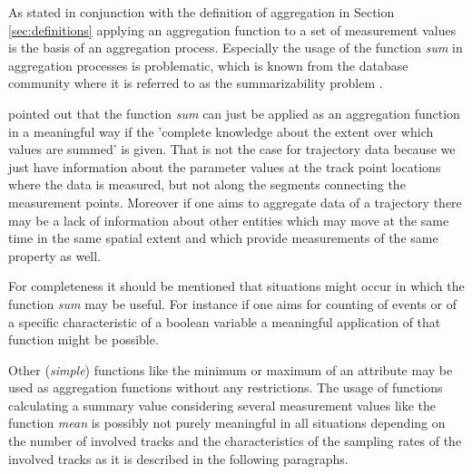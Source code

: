 \documentclass[12pt, oneside, a4paper]{scrbook}
\begin{document}

As stated in conjunction with the definition of aggregation in Section \ref{sec:definitions}
applying an aggregation function to a set of measurement values is the basis of an aggregation process.
Especially the usage of the function \textit{sum} in aggregation processes is problematic, which is known from the database community where it is referred to as the summarizability problem \citep{lenz_summarizability_1997, mazon_survey_2009}.
\par\medskip
\citet {stasch_meaningful_2014} pointed out that the function \textit{sum} can just be applied as an aggregation function in a meaningful way if the 'complete knowledge about the extent over which values are summed' is given.
That is not the case for trajectory data because we just have information about the parameter values at the track point locations where the data is measured, but not along the segments connecting the measurement points. 
Moreover if one aims to aggregate data of a trajectory there may be a lack of information about other entities which may move at the same time in the same spatial extent and which provide measurements of the same property as well.
\par\medskip
For completeness it should be mentioned that situations might occur in which the function \textit{sum} may be useful. For instance if one aims for counting of events or of a specific characteristic of a boolean variable a meaningful application of that function might be possible.
\par\medskip
Other (\textit{simple}) functions like the minimum or maximum of an attribute may be used as aggregation functions without any restrictions.
The usage of functions calculating a summary value considering several measurement values like the function  \textit{mean} is possibly not purely meaningful in all situations depending on the number of involved tracks and the characteristics of the sampling rates of the involved tracks as it is described in the following paragraphs. 
\par\medskip


\end{document}
